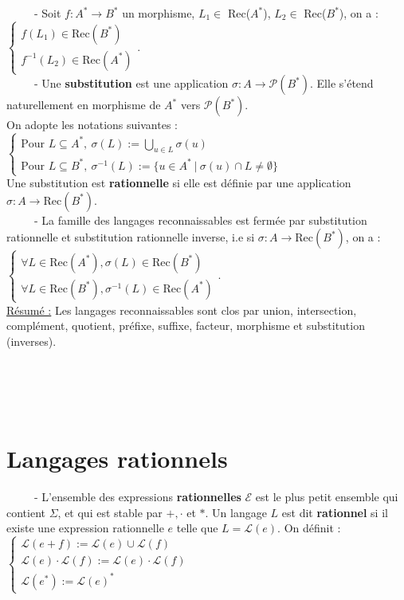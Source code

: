 \documentclass[11pt,a4paper]{article}
\begin{document}
\ \ \ \ \ - Soit $f : A^* \to B^*$ un morphisme, $L_1 \in$ Rec($A^*$),  $L_2 \in$ Rec($B^*$), on a : $\begin{cases} f(L_1) \in \text{Rec}(B^*) \\ f^{-1}(L_2) \in \text{Rec}(A^*) \end{cases}$. \\

\ \ \ \ \ - Une \textbf{substitution} est une application $\sigma : A \to \mathcal{P}(B^*)$. Elle s'étend naturellement en morphisme de $A^*$ vers $\mathcal{P}(B^*)$. \\ On adopte les notations suivantes : $\begin{cases} \text{Pour } L \subseteq A^*, \ \sigma(L) := \bigcup\limits_{u \in L} \sigma(u) \\ \text{Pour } L \subseteq B^*, \ \sigma^{-1}(L) := \{u \in A^* \ | \ \sigma(u)\cap L \neq \emptyset \} \end{cases}$ \\
Une substitution est \textbf{rationnelle} si elle est définie par une application $\sigma : A \to \text{Rec}(B^*)$. \\

\ \ \ \ \ - La famille des langages reconnaissables est fermée par substitution rationnelle et substitution rationnelle inverse, i.e si $\sigma : A \to \text{Rec}(B^*)$, on a :$\begin{cases} \forall L \in \text{Rec}(A^*), \sigma(L) \in \text{Rec}(B^*) \\ \forall L \in \text{Rec}(B^*), \sigma^{-1}(L) \in \text{Rec}(A^*) \end{cases}$. \\

\underline{Résumé :} Les langages reconnaissables sont clos par union, intersection, complément, quotient, préfixe, suffixe, facteur, morphisme et substitution (inverses). \\ \\ \\ \\ \\

\section{Langages rationnels}
\ \ \ \ \ - L'ensemble des expressions \textbf{rationnelles} $\mathcal{E}$ est le plus petit ensemble qui contient $\Sigma$, et qui est stable par $+, \cdot$ et  $*$. Un langage $L$ est dit \textbf{rationnel} si il existe une expression rationnelle $e$ telle que $L = \mathcal{L}(e)$. On définit : $ \begin{cases} \mathcal{L}(e+f) :=\mathcal{L}(e)\cup \mathcal{L}(f) \\ \mathcal{L}(e) \cdot \mathcal{L}(f):= \mathcal{L}(e)\cdot \mathcal{L}(f) \\ \mathcal{L}(e^*):=\mathcal{L}(e)^* \end{cases}$ \\
\end{document}
